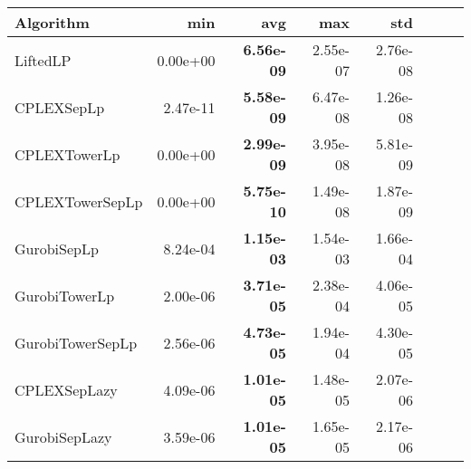\begin{tabular}{lrrrrrrr}
Algorithm & min & avg & max & std
\\
\hline
LiftedLP&0.00e+00& \bf6.56e-09& 2.55e-07& 2.76e-08\\
CPLEXSepLp&2.47e-11& \bf5.58e-09& 6.47e-08& 1.26e-08\\
CPLEXTowerLp&0.00e+00& \bf2.99e-09& 3.95e-08& 5.81e-09\\
CPLEXTowerSepLp&0.00e+00& \bf5.75e-10& 1.49e-08& 1.87e-09\\
GurobiSepLp&8.24e-04& \bf1.15e-03& 1.54e-03& 1.66e-04\\
GurobiTowerLp&2.00e-06& \bf3.71e-05& 2.38e-04& 4.06e-05\\
GurobiTowerSepLp&2.56e-06& \bf4.73e-05& 1.94e-04& 4.30e-05\\
CPLEXSepLazy&4.09e-06& \bf1.01e-05& 1.48e-05& 2.07e-06\\
GurobiSepLazy&3.59e-06& \bf1.01e-05& 1.65e-05& 2.17e-06
\end{tabular}
